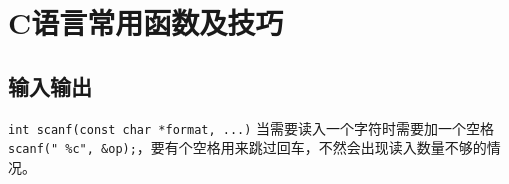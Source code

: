 \chapter{C语言常用函数及技巧}


\section{输入输出}

\lstinline{int scanf(const char *format, ...)}
当需要读入一个字符时需要加一个空格\lstinline{scanf(" %c", &op);}，要有个空格用来跳过回车，不然会出现读入数量不够的情况。